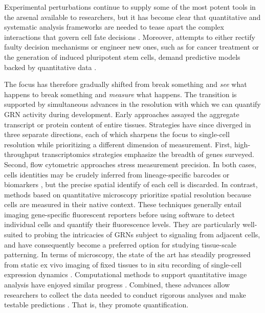 Experimental perturbations continue to supply some of the most potent tools in the arsenal available to researchers, but it has become clear that quantitative and systematic analysis frameworks are needed to tease apart the complex interactions that govern cell fate decisions \cite{Lazebnik2004,Oates2009}. Moreover, attempts to either rectify faulty decision mechanisms or engineer new ones, such as for cancer treatment or the generation of induced pluripotent stem cells, demand predictive models backed by quantitative data \cite{Hornberg2006}.

The focus has therefore gradually shifted from break something and \textit{see} what happens to break something and \textit{measure} what happens. The transition is supported by simultaneous advances in the resolution with which we can quantify GRN activity during development. Early approaches assayed the aggregate transcript or protein content of entire tissues. Strategies have since diverged in three separate directions, each of which sharpens the focus to single-cell resolution while prioritizing a different dimension of measurement. First, high-throughput transcriptomics strategies emphasize the breadth of genes surveyed. Second, flow cytometric approaches stress measurement precision. In both cases, cells identities may be crudely inferred from lineage-specific barcodes or biomarkers \cite{Herring2018}, but the precise spatial identify of each cell is discarded. In contrast, methods based on quantitative microscopy prioritize spatial resolution because cells are measured in their native context. These techniques generally entail imaging gene-specific fluorescent reporters before using software to detect individual cells and quantify their fluorescence levels. They are particularly well-suited to probing the intricacies of GRNs subject to signaling from adjacent cells, and have consequently become a preferred option for studying tissue-scale patterning. In terms of microscopy, the state of the art has steadily progressed from static ex vivo imaging of fixed tissues to in situ recording of single-cell expression dynamics \cite{Keller2013}. Computational methods to support quantitative image analysis have enjoyed similar progress \cite{Sbalzarini2016}. Combined, these advances allow researchers to collect the data needed to conduct rigorous analyses and make testable predictions \cite{qbio2018}. That is, they promote quantification.

